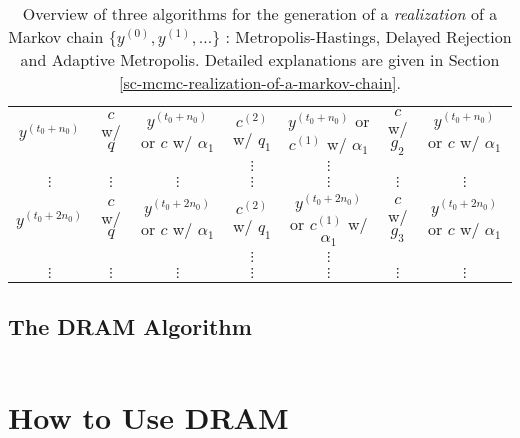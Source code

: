 \begin{sidewaystable}[h]
\begin{tabular}{|c||c|c||c|c||c|c|}
\hline
\hline
$y^{(t_0+n_0)}$ & $c$ w/ $q$              & $y^{(t_0+n_0)}$ or $c$ w/ $\alpha_1$ & $c^{(2)}$ w/ $q_1$     & $y^{(t_0+n_0)}$ or $c^{(1)}$ w/ $\alpha_1$ & $c$ w/ $g_2$     & $y^{(t_0+n_0)}$ or $c$ w/ $\alpha_1$ \\
\cline{4-5}
                     &                         &                                         & $\vdots$               & $\vdots$                                        &                  &                                         \\
\hline
\hline
$\vdots$             & $\vdots$                & $\vdots$                                & $\vdots$               & $\vdots$                                        & $\vdots$         & $\vdots$                                \\
\hline
\hline
$y^{(t_0+2n_0)}$& $c$ w/ $q$              & $y^{(t_0+2n_0)}$ or $c$ w/ $\alpha_1$& $c^{(2)}$ w/ $q_1$     & $y^{(t_0+2n_0)}$ or $c^{(1)}$ w/ $\alpha_1$& $c$ w/ $g_3$     & $y^{(t_0+2n_0)}$ or $c$ w/ $\alpha_1$\\
\cline{4-5}
                     &                         &                                         & $\vdots$               & $\vdots$                                        &                  &                                         \\
\hline
\hline
$\vdots$             & $\vdots$                & $\vdots$                                & $\vdots$               & $\vdots$                                        & $\vdots$         & $\vdots$                                \\
\hline
\end{tabular}
\caption{Overview of three algorithms for the generation of a {\it realization} of a Markov chain 
$\{y^{(0)},y^{(1)},\ldots\}$
: Metropolis-Hastings, Delayed Rejection and Adaptive Metropolis.
Detailed explanations are given in Section \ref{sc-mcmc-realization-of-a-markov-chain}.
}
\label{tab-dram}
\end{sidewaystable}

\subsection{The DRAM Algorithm}%
$~$\\

\section{How to Use DRAM}\label{sc-mcmc-how-to-use-dram}

